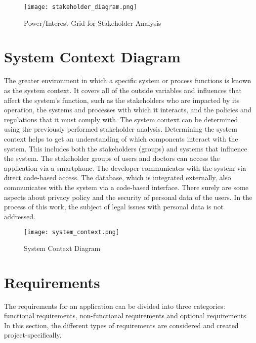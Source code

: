\begin{figure}[h]
	\centering
	\texttt{[image: stakeholder\_diagram.png]}
	\caption[Power/Interest Grid for Stakeholder-Analysis ]{Power/Interest Grid for Stakeholder-Analysis}
\end{figure}	

\section{System Context Diagram}
The greater environment in which a specific system or process functions is known as the system context. It covers all of the outside variables and influences that affect the system's function, such as the stakeholders who are impacted by its operation, the systems and processes with which it interacts, and the policies and regulations that it must comply with. The system context can be determined using the previously performed stakeholder analysis. Determining the system context helps to get an understanding of which components interact with the system. This includes both the stakeholders (groups) and systems that influence the system. The stakeholder groups of users and doctors can access the application via a smartphone. The developer communicates with the system via direct code-based access. The database, which is integrated externally, also communicates with the system via a code-based interface. There surely are some aspects about privacy policy and the security of personal data of the users. In the process of this work, the subject of legal issues with personal data is not addressed. 

\begin{figure}[h!]
	\centering
	\texttt{[image: system\_context.png]}
	\caption[System Context Diagram ]{System Context Diagram}
\end{figure}


\section{Requirements}
The requirements for an application can be divided into three categories: functional requirements, non-functional requirements and optional requirements. In this section, the different types of requirements are considered and created project-specifically.

